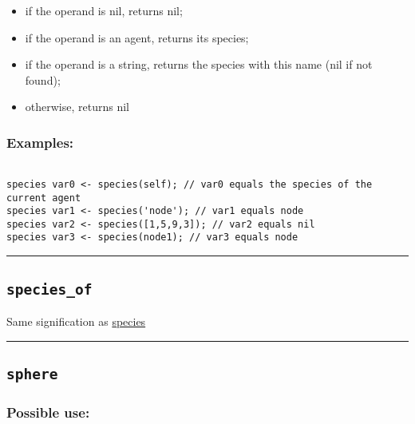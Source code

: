 \documentclass[]{book}
\providecommand{\tightlist}{%
  \setlength{\itemsep}{0pt}\setlength{\parskip}{0pt}}
\theoremstyle{definition}
\theoremstyle{definition}
\theoremstyle{definition}
\theoremstyle{remark}
\begin{document}
\begin{itemize}
\tightlist
\item
  if the operand is nil, returns nil;\\
\item
  if the operand is an agent, returns its species;\\
\item
  if the operand is a string, returns the species with this name (nil if
  not found);\\
\item
  otherwise, returns nil
\end{itemize}

\subsubsection{Examples:}\label{examples-341}

\begin{verbatim}
 
species var0 <- species(self); // var0 equals the species of the current agent 
species var1 <- species('node'); // var1 equals node 
species var2 <- species([1,5,9,3]); // var2 equals nil 
species var3 <- species(node1); // var3 equals node
\end{verbatim}

\begin{center}\rule{0.5\linewidth}{\linethickness}\end{center}

\subsection{\texorpdfstring{\texttt{species\_of}}{species\_of}}\label{species_of}

Same signification as \href{operators-s-to-z.html\#species}{species}

\begin{center}\rule{0.5\linewidth}{\linethickness}\end{center}

\subsection{\texorpdfstring{\texttt{sphere}}{sphere}}\label{sphere}

\subsubsection{Possible use:}\label{possible-use-490}
\end{document}
